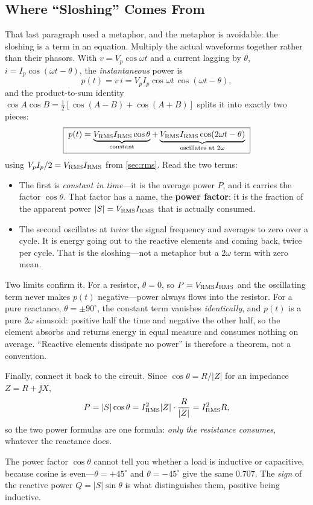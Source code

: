 \subsection{Where ``Sloshing'' Comes From}
\label{sec:instpower}
That last paragraph used a metaphor, and the metaphor is avoidable: the sloshing is
a term in an equation. Multiply the actual waveforms together rather than their
phasors. With \(v=V_p\cos\omega t\) and a current lagging by \(\theta\),
\(i=I_p\cos(\omega t-\theta)\), the \emph{instantaneous} power is
\[
p(t)=v\,i=V_pI_p\cos\omega t\,\cos(\omega t-\theta),
\]
and the product-to-sum identity
\(\cos A\cos B=\tfrac12[\cos(A-B)+\cos(A+B)]\) splits it into exactly two pieces:
\[
\boxed{\;
p(t)=\underbrace{V_{\mathrm{RMS}}I_{\mathrm{RMS}}\cos\theta}_{\text{constant}}
+\underbrace{V_{\mathrm{RMS}}I_{\mathrm{RMS}}\cos(2\omega t-\theta)}_{\text{oscillates at }2\omega} \;}
\]
using \(V_pI_p/2=V_{\mathrm{RMS}}I_{\mathrm{RMS}}\) from \cref{sec:rms}. Read the two terms:
\begin{itemize}
\item The first is \emph{constant in time}---it is the average power \(P\), and it
carries the factor \(\cos\theta\). That factor has a name, the \textbf{power
factor}: it is the fraction of the apparent power \(|S|=V_{\mathrm{RMS}}I_{\mathrm{RMS}}\) that is
actually consumed.
\item The second oscillates at \emph{twice} the signal frequency and averages to
zero over a cycle. It is energy going out to the reactive elements and coming back,
twice per cycle. That is the sloshing---not a metaphor but a \(2\omega\) term with
zero mean.
\end{itemize}
Two limits confirm it. For a resistor, \(\theta=0\), so \(P=V_{\mathrm{RMS}}I_{\mathrm{RMS}}\) and
the oscillating term never makes \(p(t)\) negative---power always flows into the
resistor. For a pure reactance, \(\theta=\pm90^\circ\), the constant term vanishes
\emph{identically}, and \(p(t)\) is a pure \(2\omega\) sinusoid: positive half the
time and negative the other half, so the element absorbs and returns energy in equal
measure and consumes nothing on average. ``Reactive elements dissipate no power'' is
therefore a theorem, not a convention.

Finally, connect it back to the circuit. Since \(\cos\theta=R/|Z|\) for an impedance
\(Z=R+\jj X\),
\[
P=|S|\cos\theta=I_{\mathrm{RMS}}^2|Z|\cdot\frac{R}{|Z|}=I_{\mathrm{RMS}}^2R,
\]
so the two power formulas are one formula: \emph{only the resistance consumes},
whatever the reactance does.
\cite[pp.~38--39]{white2004highfrequency}

\begin{mistakebox}
The power factor \(\cos\theta\) cannot tell you whether a load is inductive or
capacitive, because cosine is even---\(\theta=+45^\circ\) and \(\theta=-45^\circ\)
give the same \(0.707\). The \emph{sign} of the reactive power
\(Q=|S|\sin\theta\) is what distinguishes them, positive being inductive.
\end{mistakebox}

